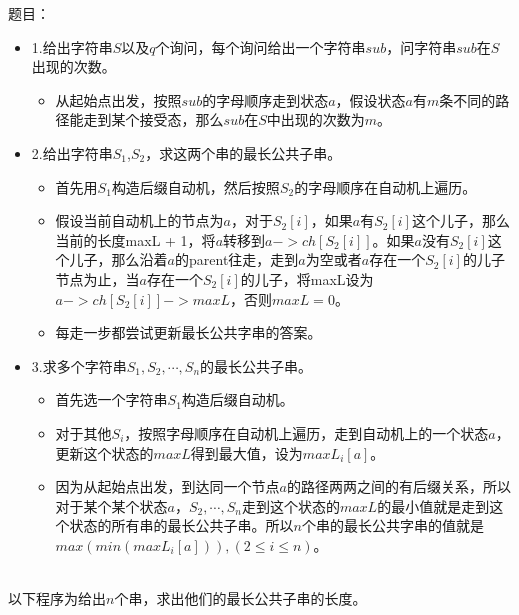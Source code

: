 题目：\par
\begin{itemize}
    \item 1.给出字符串$S$以及$q$个询问，每个询问给出一个字符串$sub$，问字符串$sub$在$S$出现的次数。
        \begin{itemize}
            \item 从起始点出发，按照$sub$的字母顺序走到状态$a$，假设状态$a$有$m$条不同的路径能走到某个接受态，那么$sub$在$S$中出现的次数为$m$。
        \end{itemize}
    \item 2.给出字符串$S_1$,$S_2$，求这两个串的最长公共子串。
        \begin{itemize}
            \item 首先用$S_1$构造后缀自动机，然后按照$S_2$的字母顺序在自动机上遍历。
            \item 假设当前自动机上的节点为$a$，对于$S_2[i]$，如果$a$有$S_2[i]$这个儿子，那么当前的长度maxL + 1，将$a$转移到$a->ch[S_2[i]]$。如果$a$没有$S_2[i]$这个儿子，那么沿着$a$的parent往走，走到$a$为空或者$a$存在一个$S_2[i]$的儿子节点为止，当$a$存在一个$S_2[i]$的儿子，将maxL设为$a->ch[S_2[i]]->maxL$，否则$maxL = 0$。
            \item 每走一步都尝试更新最长公共字串的答案。
        \end{itemize}
    \item 3.求多个字符串$S_1, S_2, \cdots, S_n$的最长公共子串。
        \begin{itemize}
            \item 首先选一个字符串$S_1$构造后缀自动机。
            \item 对于其他$S_i$，按照字母顺序在自动机上遍历，走到自动机上的一个状态$a$，更新这个状态的$maxL$得到最大值，设为$maxL_i[a]$。
            \item 因为从起始点出发，到达同一个节点$a$的路径两两之间的有后缀关系，所以对于某个某个状态$a$，$S_2,\cdots,S_n$走到这个状态的$maxL$的最小值就是走到这个状态的所有串的最长公共子串。所以$n$个串的最长公共字串的值就是$max(min(maxL_i[a])), (2\leq i\leq n)$。
        \end{itemize}
\end{itemize}

~\\
以下程序为给出$n$个串，求出他们的最长公共子串的长度。

